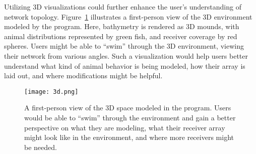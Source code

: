 Utilizing 3D visualizations could further enhance the user's understanding of network topology.  Figure~\ref{3d} illustrates a first-person view of the 3D environment modeled by the program.  Here, bathymetry is rendered as 3D mounds, with animal distributions represented by green fish, and receiver coverage by red spheres.  Users might be able to ``swim'' through the 3D environment, viewing their network from various angles.  Such a visualization would help users better understand what kind of animal behavior is being modeled, how their array is laid out, and where modifications might be helpful.

\begin{figure}[ht]
	\texttt{[image: 3d.png]}
	\caption{A first-person view of the 3D space modeled in the program.  Users would be able to ``swim'' through the environment and gain a better perspective on what they are modeling, what their receiver array might look like in the environment, and where more receivers might be needed.\label{3d}}
\end{figure}
